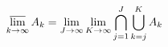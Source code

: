 \begin{equation}
  \varlimsup_{k\to\infty} A_k = \lim_{J\to\infty} \lim_{K\to\infty}
    \bigcap_{j=1}^J \bigcup_{k=j}^K A_k
\end{equation}
